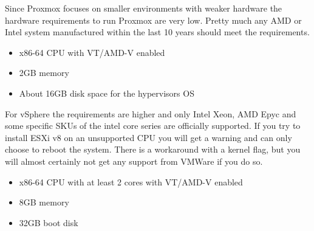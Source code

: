 Since Proxmox focuses on smaller environments with weaker hardware the hardware requirements to run Proxmox are very low. Pretty much any AMD or Intel system manufactured within the last 10 years should meet the requirements.

\begin{itemize}
	\item x86-64 CPU with VT/AMD-V enabled
	\item 2GB memory
	\item About 16GB disk space for the hypervisors OS
\end{itemize}

For vSphere the requirements are higher and only Intel Xeon, AMD Epyc and some specific SKUs of the intel core series are officially supported. 
If you try to install ESXi v8 on an unsupported CPU you will get a warning and can only choose to reboot the system. There is a workaround with a kernel flag, but you will almost certainly not get any support from VMWare if you do so. 

\begin{itemize}
	\item x86-64 CPU with at least 2 cores with VT/AMD-V enabled
	\item 8GB memory
	\item 32GB boot disk
\end{itemize}